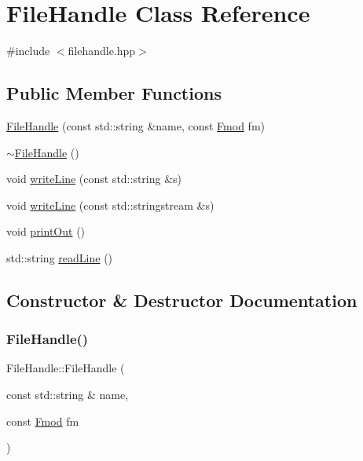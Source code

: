 \hypertarget{classFileHandle}{}\section{File\+Handle Class Reference}
\label{classFileHandle}


{\ttfamily \#include $<$filehandle.\+hpp$>$}

\subsection*{Public Member Functions}
\begin{DoxyCompactItemize}
\item 
\mbox{\hyperlink{classFileHandle_ae8793d47326513bafa0c147c00286ca7}{File\+Handle}} (const std\+::string \&name, const \mbox{\hyperlink{filehandle_8hpp_ad884e025a0daf7ac608887abac214a12}{Fmod}} fm)
\item 
\mbox{\hyperlink{classFileHandle_a82b120a28b10d0637d84e490fbc9836a}{$\sim$\+File\+Handle}} ()
\item 
void \mbox{\hyperlink{classFileHandle_a73927a95279e6d2ef89e4bf04b705c6f}{write\+Line}} (const std\+::string \&s)
\item 
void \mbox{\hyperlink{classFileHandle_ab29b54653be4f74651163760f8edd395}{write\+Line}} (const std\+::stringstream \&s)
\item 
void \mbox{\hyperlink{classFileHandle_a363a46ef01ba33c2c51b9438f88929cd}{print\+Out}} ()
\item 
std\+::string \mbox{\hyperlink{classFileHandle_ad54fc998e0384881f2658208d5c6c81d}{read\+Line}} ()
\end{DoxyCompactItemize}


\subsection{Constructor \& Destructor Documentation}
\mbox{\label{classFileHandle_ae8793d47326513bafa0c147c00286ca7}} 
\subsubsection{\texorpdfstring{FileHandle()}{FileHandle()}}
{\footnotesize\ttfamily File\+Handle\+::\+File\+Handle (\begin{DoxyParamCaption}\item[{const std\+::string \&}]{name,  }\item[{const \mbox{\hyperlink{filehandle_8hpp_ad884e025a0daf7ac608887abac214a12}{Fmod}}}]{fm }\end{DoxyParamCaption})}

